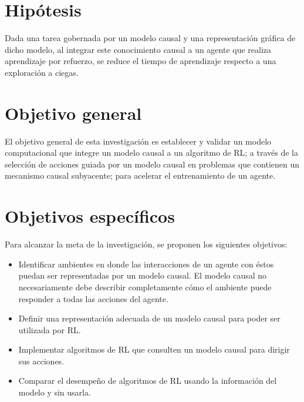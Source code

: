 \section{Hipótesis}



Dada una tarea gobernada por un modelo causal y una representación
gráfica de dicho modelo, al integrar este conocimiento causal
a un agente que realiza aprendizaje por refuerzo, se reduce
el tiempo de aprendizaje respecto a una exploración a ciegas.

\section{Objetivo general}
El objetivo general de esta investigación
es establecer y validar un modelo computacional que integre 
un modelo causal a un algoritmo de RL; a través de
la selección de acciones guiada por un 
modelo causal en problemas que contienen
un mecanismo causal subyacente; para acelerar el entrenamiento de un agente.
\section{Objetivos específicos}

Para alcanzar la meta de la investigación, se proponen
los siguientes objetivos:

\begin{itemize}
    \item Identificar ambientes en donde 
    las interacciones de un agente con éstos puedan ser representadas por un modelo causal.
    El modelo causal no necesariamente debe
    describir completamente cómo el ambiente puede responder a todas las acciones del agente.
    \item Definir una representación adecuada
    de un modelo causal para poder ser utilizada 
    por RL.
    \item Implementar algoritmos de RL que consulten un modelo causal para dirigir sus acciones.
    \item Comparar el desempeño de algoritmos
    de RL usando la información del modelo y 
    sin usarla. 
\end{itemize}


